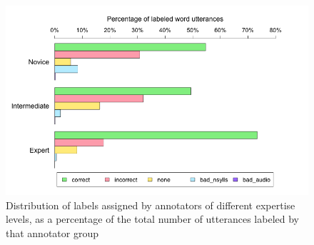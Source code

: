 			\begin{figure}[tb]
				\centering
				\includegraphics[width=\textwidth]{img/plots/pctJudgmentsByExpertise-notStacked}
				\caption[Distribution of labels by annotator expertise]{Distribution of labels assigned by annotators of different expertise levels,
				as a percentage of the total number of utterances labeled by that annotator group
				}
				\label{fig:agreement:expertisebars}
			\end{figure}			
			
			
			
%				
			
